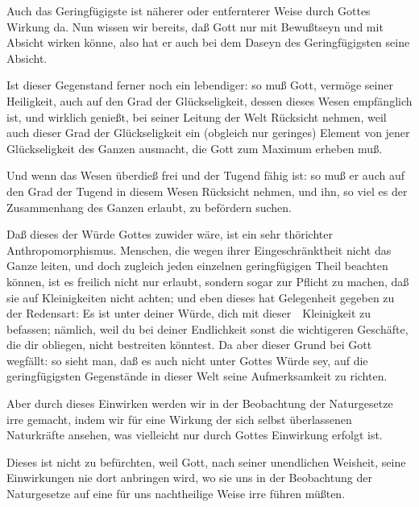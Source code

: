 \begin{aufzb}
\item Auch das Geringfügigste ist näherer oder entfernterer Weise durch Gottes Wirkung da. Nun wissen wir bereits, daß Gott nur mit Bewußtseyn und mit Absicht wirken könne, also hat er auch bei dem Daseyn des Geringfügigsten seine Absicht.
\item Ist dieser Gegenstand ferner noch ein lebendiger: so muß Gott, vermöge seiner Heiligkeit, auch auf den Grad der Glückseligkeit, dessen dieses Wesen empfänglich ist, und wirklich genießt, bei seiner Leitung der Welt Rücksicht nehmen, weil auch dieser Grad der Glückseligkeit ein (obgleich nur geringes) Element von jener Glückseligkeit des Ganzen ausmacht, die Gott zum Maximum erheben muß.
\item Und wenn das Wesen überdieß frei und der Tugend fähig ist: so muß er auch auf den Grad der Tugend in diesem Wesen Rücksicht nehmen, und ihn, so viel es der Zusammenhang des Ganzen erlaubt, zu befördern suchen.
\item Daß dieses der Würde Gottes zuwider wäre, ist ein sehr thörichter Anthropomorphismus. Menschen, die wegen ihrer Eingeschränktheit nicht das Ganze leiten, und doch zugleich jeden einzelnen geringfügigen Theil beachten können, ist es freilich nicht nur erlaubt, sondern sogar zur Pflicht zu machen, daß sie auf Kleinigkeiten nicht achten; und eben dieses hat Gelegenheit gegeben zu der Redensart: Es ist unter deiner Würde, dich mit dieser~\ Kleinigkeit zu befassen; nämlich, weil du bei deiner Endlichkeit sonst die wichtigeren Geschäfte, die dir obliegen, nicht bestreiten könntest. Da aber dieser Grund bei Gott wegfällt: so sieht man, daß es auch nicht unter Gottes Würde sey, auf die geringfügigsten Gegenstände in dieser Welt seine Aufmerksamkeit zu richten.
\end{aufzb}\par
{} Aber durch dieses Einwirken werden wir in der Beobachtung der Naturgesetze irre gemacht, indem wir für eine Wirkung der sich selbst überlassenen Naturkräfte ansehen, was vielleicht nur durch Gottes Einwirkung erfolgt ist.\par
{} Dieses ist nicht zu befürchten, weil Gott, nach seiner unendlichen Weisheit, seine Einwirkungen nie dort anbringen wird, wo sie uns in der Beobachtung der Naturgesetze auf eine für uns nachtheilige Weise irre führen müßten.
